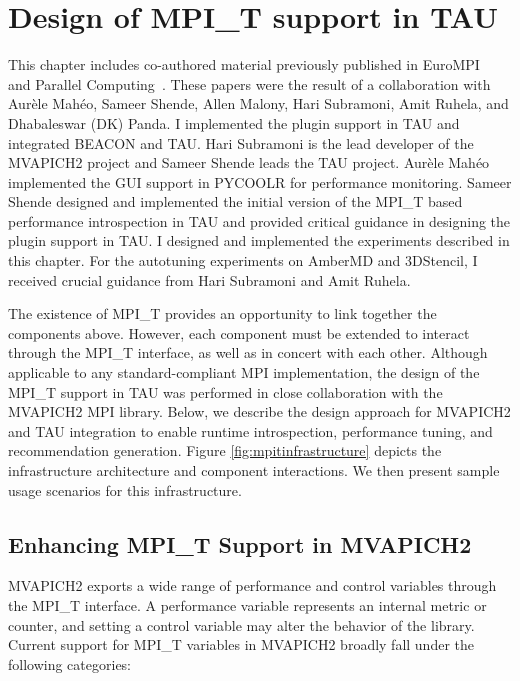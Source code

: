 \chapter{Design of MPI\_T support in TAU}
This chapter includes co-authored material previously published in EuroMPI~\cite{EuroMPI} and Parallel Computing~\cite{ParCo}. These papers were the result of a collaboration with Aur\`{e}le Mah\'{e}o, Sameer Shende, Allen Malony, Hari Subramoni, Amit Ruhela, and Dhabaleswar (DK) Panda. I implemented the plugin support in TAU and integrated BEACON and TAU. Hari Subramoni is the lead developer of the MVAPICH2 project and Sameer Shende leads the TAU project. Aur\`{e}le Mah\'{e}o implemented the GUI support in PYCOOLR for performance monitoring. Sameer Shende designed and implemented the initial version of the MPI\_T based performance introspection in TAU and provided critical guidance in designing the plugin support in TAU. I designed and implemented the experiments described in this chapter. For the autotuning experiments on AmberMD and 3DStencil, I received crucial guidance from Hari Subramoni and Amit Ruhela. 
\par The existence of MPI\_T provides an opportunity to link together the components above. However, each component must be extended to interact through the MPI\_T interface, as well as in concert with each other. Although applicable to any standard-compliant MPI implementation, the design of the MPI\_T support in TAU was performed in close collaboration with the MVAPICH2 MPI library. Below, we describe the design approach for MVAPICH2 and TAU integration to enable runtime introspection, performance tuning, and recommendation generation. Figure \ref{fig:mpitinfrastructure} depicts the infrastructure architecture and component interactions. We then present sample usage scenarios for this infrastructure. 
\section {Enhancing MPI\_T Support in MVAPICH2}
MVAPICH2 exports a wide range of performance and control variables through the MPI\_T interface. A performance variable represents an internal metric or counter, and setting a control variable may alter the behavior of the library. Current support for MPI\_T variables in MVAPICH2 broadly fall under the following categories:
